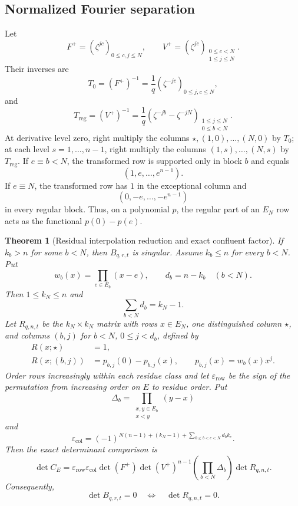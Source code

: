 \documentclass[11pt]{amsart}
\newcommand{\1}{\mathbf 1}
\newtheorem{theorem}{Theorem}[section]
\theoremstyle{remark}
\begin{document}
\subsection{Normalized Fourier separation}
Let
\[
 F^+=(\zeta^{jc})_{0\le c,j\le N},\qquad
 V^+=(\zeta^{jc})_{\substack{0\le c<N\\1\le j\le N}}.
\]
Their inverses are
\[
 T_0=(F^+)^{-1}=\frac1q(\zeta^{-jc})_{0\le j,c\le N},
\]
and
\[
 T_{\mathrm{reg}}=(V^+)^{-1}
 =\frac1q(\zeta^{-jb}-\zeta^{-jN})_{\substack{1\le j\le N\\0\le b<N}}.
\]
At derivative level zero, right multiply the columns $\star,(1,0),\ldots,(N,0)$ by $T_0$; at each level $s=1,\ldots,n-1$, right multiply the columns $(1,s),\ldots,(N,s)$ by $T_{\mathrm{reg}}$. If $e\equiv b<N$, the transformed row is supported only in block $b$ and equals
\[
 (1,e,\ldots,e^{n-1}).
\]
If $e\equiv N$, the transformed row has $1$ in the exceptional column and
\[
 (0,-e,\ldots,-e^{n-1})
\]
in every regular block. Thus, on a polynomial $p$, the regular part of an $E_N$ row acts as the functional $p(0)-p(e)$.

\begin{theorem}[Residual interpolation reduction and exact confluent factor]\label{thm:residual-reduction}
If $k_b>n$ for some $b<N$, then $B_{q,r,t}$ is singular. Assume $k_b\le n$ for every $b<N$. Put
\[
 w_b(x)=\prod_{e\in E_b}(x-e),\qquad d_b=n-k_b\quad(b<N).
\]
Then $1\le k_N\le n$ and
\begin{equation}\label{eq:dimension-R}
 \sum_{b<N}d_b=k_N-1.
\end{equation}
Let $R_{q,n,t}$ be the $k_N\times k_N$ matrix with rows $x\in E_N$, one distinguished column $\star$, and columns $(b,j)$ for $b<N$, $0\le j<d_b$, defined by
\begin{align}
 R(x;\star)&=1,\label{eq:Rstar-main}\\
 R(x;(b,j))&=p_{b,j}(0)-p_{b,j}(x),
 \qquad p_{b,j}(x)=w_b(x)x^j.\label{eq:Rcols-main}
\end{align}
Order rows increasingly within each residue class and let $\varepsilon_{\mathrm{row}}$ be the sign of the permutation from increasing order on $E$ to residue order. Put
\[
 \Delta_b=\prod_{\substack{x,y\in E_b\\x<y}}(y-x)
\]
and
\[
 \varepsilon_{\mathrm{col}}=(-1)^{N(n-1)+(k_N-1)+\sum_{0\le b<c<N}d_bk_c}.
\]
Then the exact determinant comparison is
\begin{equation}\label{eq:CE-R-main}
 \boxed{\det C_E=\varepsilon_{\mathrm{row}}\varepsilon_{\mathrm{col}}
 \det(F^+)\det(V^+)^{n-1}
 \left(\prod_{b<N}\Delta_b\right)\det R_{q,n,t}.}
\end{equation}
Consequently,
\begin{equation}\label{eq:B-R-main}
 \det B_{q,r,t}=0\quad\Longleftrightarrow\quad\det R_{q,n,t}=0.
\end{equation}
\end{theorem}
\end{document}
